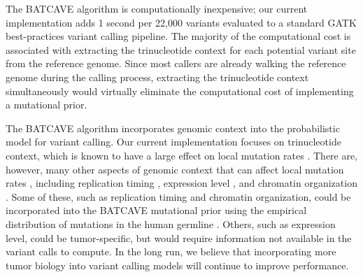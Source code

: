 \documentclass[a4,center,fleqn]{NAR}
\newcommand{\batcave}{BATCAVE\xspace}
\begin{document}
The \batcave algorithm is computationally inexpensive; our current implementation adds 1 second per 22,000 variants evaluated to a standard GATK best-practices variant calling pipeline.
The majority of the computational cost is associated with extracting the trinucleotide context for each potential variant site from the reference genome.
Since most callers are already walking the reference genome during the calling process, extracting the trinucleotide context simultaneously would virtually eliminate the computational cost of implementing a mutational prior.

The \batcave algorithm incorporates genomic context into the probabilistic model for variant calling.
Our current implementation focuses on trinucleotide context, which is known to have a large effect on local mutation rates \cite{Martincorena2015,Hollstein2017}.
There are, however, many other aspects of genomic context that can affect local mutation rates \cite{Buisson2019}, including replication timing \cite{Stamatoyannopoulos2009}, expression level \cite{Pleasance2010}, and chromatin organization \cite{Schuster-Bockler2012}. 
Some of these, such as replication timing and chromatin organization, could be incorporated into the \batcave mutational prior using the empirical distribution of mutations in the human germline \cite{Hodgkinson2011}.
Others, such as expression level, could be tumor-specific, but would require information not available in the variant calls to compute.
In the long run, we believe that incorporating more tumor biology into variant calling models will continue to improve performance.
\end{document}
